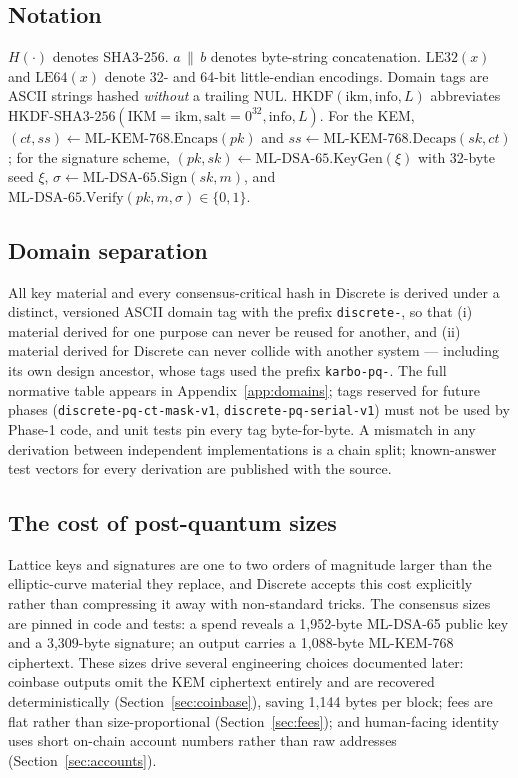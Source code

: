 \documentclass[11pt,a4paper]{article}
\newcommand{\code}[1]{\texttt{\small #1}}
\newcommand{\HKDF}{\mathrm{HKDF}}
\newcommand{\KEM}{\mathrm{ML\text{-}KEM\text{-}768}}
\newcommand{\DSA}{\mathrm{ML\text{-}DSA\text{-}65}}
\newcommand{\concat}{\,\|\,}
\begin{document}
\subsection{Notation}

$H(\cdot)$ denotes SHA3-256. $a \concat b$ denotes byte-string concatenation.
$\mathrm{LE32}(x)$ and $\mathrm{LE64}(x)$ denote 32- and 64-bit little-endian
encodings. Domain tags are ASCII strings hashed \emph{without} a trailing NUL.
$\HKDF(\mathrm{ikm}, \mathrm{info}, L)$ abbreviates
$\mathrm{HKDF\text{-}SHA3\text{-}256}(\mathrm{IKM}{=}\mathrm{ikm},
\mathrm{salt}{=}0^{32}, \mathrm{info}, L)$.
For the KEM, $(\mathit{ct}, \mathit{ss}) \leftarrow \KEM.\mathrm{Encaps}(pk)$
and $\mathit{ss} \leftarrow \KEM.\mathrm{Decaps}(sk, \mathit{ct})$; for the
signature scheme, $(pk, sk) \leftarrow \DSA.\mathrm{KeyGen}(\xi)$ with 32-byte
seed $\xi$, $\sigma \leftarrow \DSA.\mathrm{Sign}(sk, m)$, and
$\DSA.\mathrm{Verify}(pk, m, \sigma) \in \{0,1\}$.

\subsection{Domain separation}\label{sec:domains}

All key material and every consensus-critical hash in Discrete is derived
under a distinct, versioned ASCII domain tag with the prefix
\code{discrete-}, so that (i) material derived for one purpose can never be
reused for another, and (ii) material derived for Discrete can never collide
with another system --- including its own design ancestor, whose tags used the
prefix \code{karbo-pq-}. The full normative table appears in
Appendix~\ref{app:domains}; tags reserved for future phases
(\code{discrete-pq-ct-mask-v1}, \code{discrete-pq-serial-v1}) must not be used
by Phase-1 code, and unit tests pin every tag byte-for-byte. A mismatch in any
derivation between independent implementations is a chain split; known-answer
test vectors for every derivation are published with the source.

\subsection{The cost of post-quantum sizes}

Lattice keys and signatures are one to two orders of magnitude larger than
the elliptic-curve material they replace, and Discrete accepts this cost
explicitly rather than compressing it away with non-standard tricks. The
consensus sizes are pinned in code and tests: a spend reveals a
1{,}952-byte ML-DSA-65
public key and a 3{,}309-byte signature; an output carries a 1{,}088-byte
ML-KEM-768 ciphertext. These sizes drive several engineering choices
documented later: coinbase outputs omit the KEM ciphertext entirely and are
recovered deterministically (Section~\ref{sec:coinbase}), saving 1{,}144
bytes per block; fees are flat rather than size-proportional
(Section~\ref{sec:fees}); and human-facing identity uses short on-chain
account numbers rather than raw addresses (Section~\ref{sec:accounts}).
\end{document}
